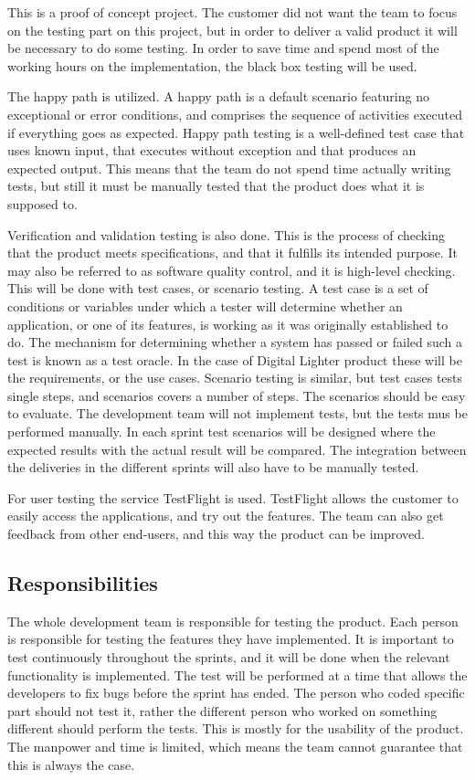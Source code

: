 This is a proof of concept project. The customer did not want the team to focus on the testing part on this project, but in order to deliver a valid product it will be necessary to do some testing. In order to save time and spend most of the working hours on the implementation, the black box testing will be used.  

The happy path is utilized. A happy path is a default scenario featuring no exceptional or error conditions, and comprises the sequence of activities executed if everything goes as expected. Happy path testing is a well-defined test case that uses known input, that executes without exception and that produces an expected output. This means that the team do not spend time actually writing tests, but still it must be manually tested that the product does what it is supposed to.

Verification and validation testing is also done. 
This is the process of checking that the product meets specifications, and that it fulfills its intended purpose. It may also be referred to as software quality control, and it is high-level checking. 
This will be done with test cases, or scenario testing. 
A test case is a set of conditions or variables under which a tester will determine whether an application, or one of its features, is working as it was originally established to do. 
The mechanism for determining whether a system has passed or failed such a test is known as a test oracle. 
In the case of Digital Lighter product these will be the requirements, or the use cases. Scenario testing is similar, but test cases tests single steps, and scenarios covers a number of steps. 
The scenarios should be easy to evaluate. 
The development team will not implement tests, but the tests  mus be performed manually. 
In each sprint test scenarios will be designed where the expected results with the actual result will be compared.
The integration between the deliveries in the different sprints will also have to be manually tested. 

For user testing the service TestFlight is used. TestFlight allows the customer to easily access the applications, and try out the features. The team can also get feedback from other end-users, and this way the product can be improved.  


\subsection{Responsibilities}
The whole development team is responsible for testing the product. 
Each person is responsible for testing the features they have implemented. It is important to test continuously throughout the sprints, and it will be done when the relevant functionality is implemented. The test will be performed at a time that allows the developers to fix bugs before the sprint has ended.
The person who coded specific part should not test it, rather the different person who worked on something different should perform the tests. 
This is mostly for the usability of the product. The manpower and time is limited, which means the team cannot guarantee that this is always the case.
 

